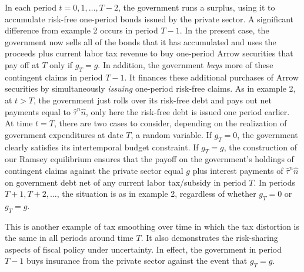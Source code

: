 In each period $t=0,1, \ldots ,T-2$, the government
runs a surplus, using it to accumulate risk-free one-period bonds issued by the
private sector. A significant difference from example 2 occurs in
period $T-1$.  In the present case, the government now sells all of the bonds that it has accumulated and uses
the proceeds plus current labor tax revenue to buy one-period Arrow securities
that  pay off at $T$ only if $g_T=g$. In addition, the government {\it buys\/} more of these contingent
claims in period $T-1$. It finances these additional purchases of Arrow securities by simultaneously {\it issuing\/} one-period risk-free claims.
As in example 2,
at $t > T$, the government just rolls over its risk-free debt and pays out net
payments
equal to $\hat \tau^n \hat n$, only  here the risk-free debt is issued one period earlier.
At time $t=T$, there are two cases to consider, depending on the realization of  government expenditures at date $T$, a random variable.
If $g_T=0$, the government clearly satisfies
its intertemporal budget constraint. If $g_T=g$, the construction
of our Ramsey equilibrium ensures that the payoff on the government's
holdings of contingent claims against the private sector  equal
$g$ plus interest payments of $\hat \tau^n \hat n$ on government debt net
of any current labor tax/subsidy in period $T$. In periods $T+1,T+2,\ldots$,
the situation is as in example 2, regardless of whether $g_T=0$ or
$g_T=g$.

This is another example of tax smoothing over time in which the  tax distortion is the same in all periods around time $T$. It also
demonstrates the risk-sharing aspects of fiscal policy under uncertainty.
In effect, the government in period $T-1$ buys insurance from the private
sector against the event that $g_T=g$.
 
